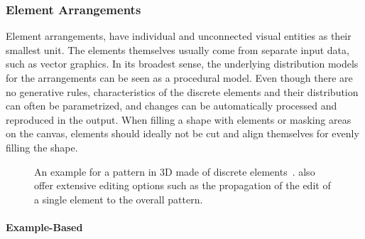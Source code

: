 \subsubsection{Element Arrangements}
\label{subsubsec:analysis_element_arrangements}

Element arrangements,  have individual and unconnected visual entities as their smallest unit. The elements themselves usually come from separate input data, such as vector graphics. In its broadest sense, the underlying distribution models for the arrangements can be seen as a procedural model. Even though there are no generative rules, characteristics of the discrete elements and their distribution can often be parametrized, and changes can be automatically processed and reproduced in the output. When filling a shape with elements or masking areas on the canvas, elements should ideally not be cut and align themselves for evenly filling the shape.

\begin{figure}[htb!]
    \centering
    \caption{\label{fig:ma_2011_det}An example for a pattern in 3D made of discrete elements~\cite{ma_2011_det}. \citeauthor*{ma_2011_det} also offer extensive editing options such as the propagation of the edit of a single element to the overall pattern. \color{orange}{Status rights: requested}}
\end{figure}

\paragraph*{Example-Based}
\label{para:analysis_element_arrangements_example}


